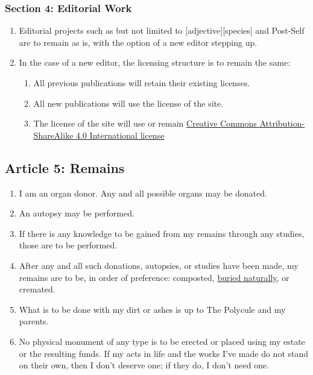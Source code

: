 \hypertarget{section-4-editorial-work}{%
\subsubsection*{Section 4: Editorial Work}\label{section-4-editorial-work}}

\begin{enumerate}
\def\labelenumi{\arabic{enumi}.}
\tightlist
\item
  Editorial projects such as but not limited to {[}adjective{]}{[}species{]} and Post-Self are to remain as is, with the option of a new editor stepping up.
\item
  In the case of a new editor, the licensing structure is to remain the same:

  \begin{enumerate}
  \def\labelenumii{\arabic{enumii}.}
  \tightlist
  \item
    All previous publications will retain their existing licenses.
  \item
    All new publications will use the license of the site.
  \item
    The license of the site will use or remain \href{https://creativecommons.org/licenses/by-sa/4.0/}{Creative Commons Attribution-ShareAlike 4.0 International license}
  \end{enumerate}
\end{enumerate}

\hypertarget{article-5-remains}{%
\subsection*{Article 5: Remains}\label{article-5-remains}}

\begin{enumerate}
\def\labelenumi{\arabic{enumi}.}
\tightlist
\item
  I am an organ donor. Any and all possible organs may be donated.
\item
  An autopsy may be performed.
\item
  If there is any knowledge to be gained from my remains through any studies, those are to be performed.
\item
  After any and all such donations, autopsies, or studies have been made, my remains are to be, in order of preference: composted, \href{https://en.wikipedia.org/wiki/Natural_burial}{buried naturally}, or cremated.
\item
  What is to be done with my dirt or ashes is up to The Polycule and my parents.
\item
  No physical monument of any type is to be erected or placed using my estate or the resulting funds. If my acts in life and the works I've made do not stand on their own, then I don't deserve one; if they do, I don't need one.
\end{enumerate}

